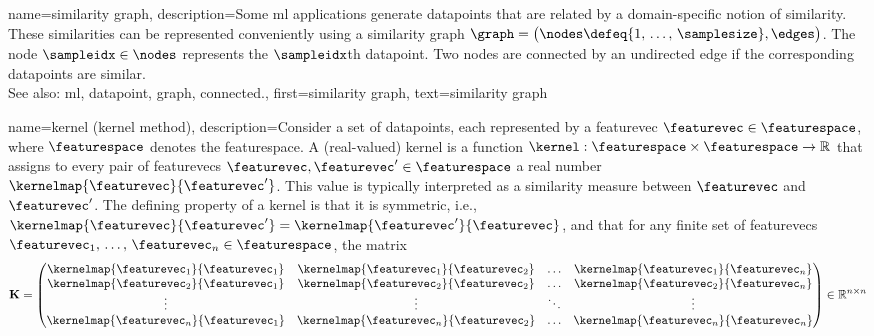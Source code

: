 {name={similarity graph}, 
 	description={Some \gls{ml} applications generate \glspl{datapoint} that 
 		are related by a domain-specific notion of similarity. These similarities can be 
 		represented conveniently using a similarity \gls{graph} $\graph = \big(\nodes \defeq \{1, \,\ldots, \,\samplesize\}, \edges\big)$. 
 		The node $\sampleidx \in \nodes$ represents the $\sampleidx$th \gls{datapoint}. Two 
 		nodes are \gls{connected} by an undirected edge if the corresponding \glspl{datapoint} are similar. 
				\\
		See also: \gls{ml}, \gls{datapoint}, \gls{graph}, \gls{connected}.},
 	first={similarity graph},
	text={similarity graph} 
}

{name={kernel (kernel method)}, 
	description={Consider a set of \glspl{datapoint}, each represented by a \gls{featurevec} 
	 	$\featurevec \in \featurespace$, where $\featurespace$ denotes the \gls{featurespace}. 
	 	A (real-valued) kernel is a \gls{function} 
	 	$\kernel: \featurespace \times \featurespace \rightarrow \mathbb{R}$ that assigns to every pair of 
     		\glspl{featurevec} $\featurevec, \featurevec' \in \featurespace$ a real number $\kernelmap{\featurevec}{\featurevec'}$. 
     		This value is typically interpreted as a similarity \gls{measure} between $\featurevec$ and $\featurevec'$. 
	 	The defining property of a kernel is that it is symmetric, i.e.,
	 	$\kernelmap{\featurevec}{\featurevec'} = \kernelmap{\featurevec'}{\featurevec}$, and that 
	 	for any finite set of \glspl{featurevec} $\featurevec_1, \,\ldots, \,\featurevec_n \in \featurespace$, the \gls{matrix} 
	  	\begin{equation}
	 		\nonumber
	 		\mathbf{K} = \begin{pmatrix}
	 			\kernelmap{\featurevec_1}{\featurevec_1} & \kernelmap{\featurevec_1}{\featurevec_2} & \ldots & \kernelmap{\featurevec_1}{\featurevec_n} \\
	 			\kernelmap{\featurevec_2}{\featurevec_1} & \kernelmap{\featurevec_2}{\featurevec_2} & \ldots & \kernelmap{\featurevec_2}{\featurevec_n} \\
	 			\vdots											
	 			& \vdots & \ddots & \vdots \\
	 			\kernelmap{\featurevec_n}{\featurevec_1} & \kernelmap{\featurevec_n}{\featurevec_2} & \ldots & \kernelmap{\featurevec_n}{\featurevec_n} 
	 		\end{pmatrix} \in \mathbb{R}^{n \times n}
	 	\end{equation}
}}
